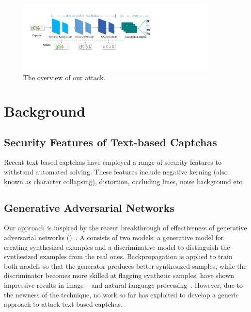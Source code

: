 \begin{figure}[!t]
  \centering
  \includegraphics[width=0.9\textwidth]{fig/overview/overview.pdf}
  \caption{The overview of our attack.}
  \label{fig:overview}
\end{figure}

\section{Background}
\subsection{Security Features of Text-based Captchas}
Recent text-based captchas have employed a range of security features to withstand automated solving. These features include negative
kerning (also known as character collapsing), distortion, occluding lines, noise background etc.


\subsection{Generative Adversarial Networks}
Our approach is inspired by the recent breakthrough of effectiveness of generative adversarial networks
(\GANs)~\cite{Goodfellow2014Generative}. A \GAN consists of two models: a generative model for creating synthesized examples and a
discriminative model to distinguish the synthesized examples from the real ones. Backpropagation is applied to train both models so that
the generator produces better synthesized samples, while the discriminator becomes more skilled at flagging synthetic samples. \GANs have
shown impressive results in image ~\cite{pix2pix2016,CycleGAN2017} and natural language processing~\cite{Yu2016SeqGAN,Li2017Adversarial}.
However, due to the newness of the technique, no work so far has exploited \GANs to develop a generic approach to attack text-based
captchas.

